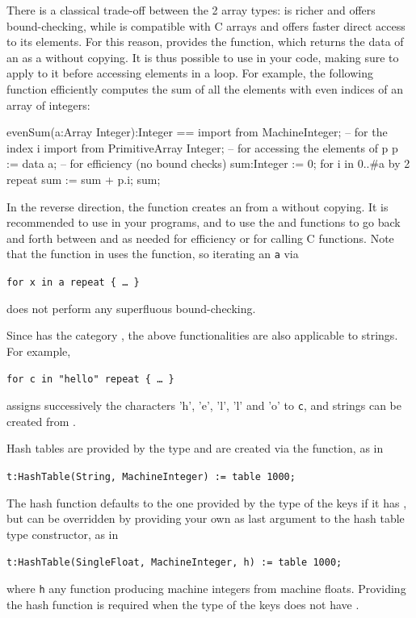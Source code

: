 There is a classical trade-off between the 2 array types:
 is richer and offers bound-checking, while
 is compatible with C arrays and offers
faster direct access to its elements.
For this reason, \salli provides the  function,
which returns
the data of an  as a  without copying.
It is thus possible to use  in your code, making sure to
apply  to it before accessing elements in a loop.
For example, the following function efficiently computes the sum
of all the elements with even indices of an array of integers:
\begin{ttyout}
evenSum(a:Array Integer):Integer == {
    import from MachineInteger;              -- for the index i
    import from PrimitiveArray Integer;      -- for accessing the elements of p
    p := data a;                             -- for efficiency (no bound checks)
    sum:Integer := 0;
    for i in 0..#a by 2 repeat sum := sum + p.i;
    sum;
}
\end{ttyout}
In the reverse direction, the function 
creates an 
from a  without copying. It is recommended to use
 in your programs, and to use the 
and  functions to go back and forth between 
and  as needed for efficiency or
for calling C functions. Note that the
 function
in  uses the  function, so iterating an
 {\tt a} via\\
\centerline{{\tt for x in a repeat \{ \dots~\}}}
does not perform any superfluous bound-checking.

Since  has the category 
, the above functionalities
are also applicable to strings. For example,\\
\centerline{{\tt for c in "hello" repeat \{ \dots~\}}}
assigns successively the characters 'h', 'e', 'l', 'l' and 'o' to {\tt c},
and strings can be created from  .

Hash tables are provided by the  type and are created
via the  function, as in\\
\centerline{{\tt t:HashTable(String, MachineInteger) := table 1000;}}
The hash function defaults to the one provided by the type of the keys
if it has , but can be overridden by providing your
own as last argument to the hash table type constructor, as in\\
\centerline{{\tt t:HashTable(SingleFloat, MachineInteger, h) := table 1000;}}
where {\tt h} any function producing machine integers from machine
floats. Providing the hash function is required when the type of
the keys does not have .

